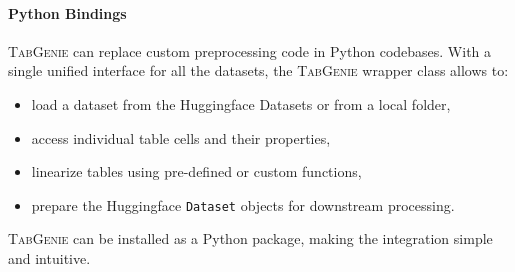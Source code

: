 \paragraph{Python Bindings} \textsc{TabGenie} can replace custom preprocessing code in Python codebases. With a single unified interface for all the datasets, the \textsc{TabGenie} wrapper class allows to:
\begin{itemize}
    \item load a dataset from the Huggingface Datasets or from a local folder,
    \item access individual table cells and their properties,
    \item linearize tables using pre-defined or custom functions,
    \item prepare the Huggingface \texttt{Dataset} objects for downstream processing.
\end{itemize}
\textsc{TabGenie} can be installed as a Python package, making the integration simple and intuitive.


